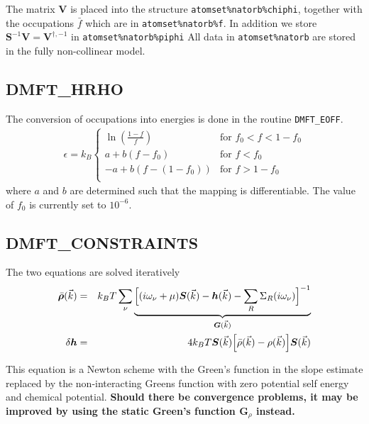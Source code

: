 \documentclass[11pt,a4paper]{report}
\newcommand{\mat}[1]{\bm{#1}}  %
\begin{document}
The matrix $\mat{V}$ is placed into the structure
\verb|atomset%natorb%chiphi|, together with the occupations $\bar{f}$
which are in \verb|atomset%natorb%f|. In addition we store
$\mat{S}^{-1}\mat{V}=\mat{V}^{\dagger,-1}$ in
\verb|atomset%natorb%piphi| All data in \verb|atomset%natorb| are
stored in the fully non-collinear model.

\subsection{DMFT\_HRHO}
The conversion of occupations into energies is done in the routine
\verb|DMFT_EOFF|.
\begin{eqnarray}
\epsilon=k_B
\begin{cases}
\ln\left(\frac{1-f}{f}\right) &\text{for $f_0<f<1-f_0$}\\
a+b(f-f_0)&\text{for $f<f_0$}\\
-a+b(f-(1-f_0))&\text{for $f>1-f_0$}\\
\end{cases}
\end{eqnarray}
where $a$ and $b$ are determined such that the mapping is
differentiable. The value of $f_0$ is currently set to $10^{-6}$.

\subsection{DMFT\_CONSTRAINTS}
The two equations are solved iteratively
\begin{eqnarray}
\bar{\mat{\rho}}(\vec{k})&=&k_BT\sum_\nu
\underbrace{\Bigl[
(i\omega_\nu+\mu)\mat{S}(\vec{k})-\mat{h}(\vec{k})-\sum_R \Sigma_R(i\omega_\nu)
\Bigr]^{-1}}_{\mat{G}(\vec{k})}
\\
\delta\mat{h}&=&4k_BT\mat{S}(\vec{k})\Bigl[
\bar{\rho}(\vec{k})-\rho(\vec{k})\Bigr]
\mat{S}(\vec{k})
\end{eqnarray}

This equation is a Newton scheme with the Green's function in the
slope estimate replaced by the non-interacting Greens function with
zero potential self energy and chemical potential. \textbf{Should
  there be convergence problems, it may be improved by using the
  static Green's function $\mat{G}_\rho$ instead.}
\end{document}
